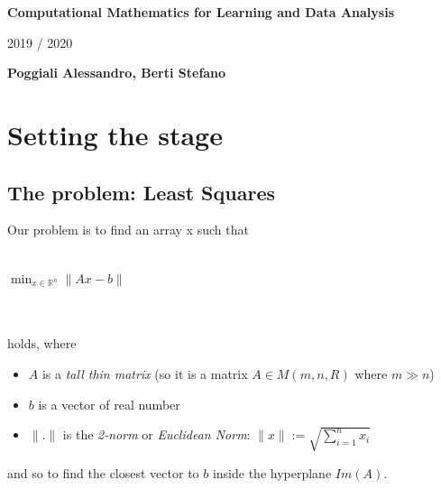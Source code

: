 \documentclass{article}
\begin{document}
\thispagestyle{plain}
\begin{center}
    \Large
    \textbf{Computational Mathematics for Learning and Data Analysis}

    \vspace{0.4cm}
    \large
    2019 / 2020

    \vspace{0.4cm}
    \textbf{Poggiali Alessandro, Berti Stefano}

    \vspace{0.9cm}
\end{center}

\newpage
\section{Setting the stage}\label{sec:setting-the-stage}

\subsection{The problem: Least Squares}\label{subsec:linear-square-problem}
Our problem is to find an array x such that \\\\
\centerline{$\min_{x \in \mathds{R}^n}\|Ax-b\|$} \\\\
holds, where
\begin{itemize}
	\item $A$ is a \textit{tall thin matrix} (so it is a matrix $A\in M(m, n, R)$ where $m \gg n$)
	\item $b$ is a vector of real number
	\item $\|.\|$ is the \textit{2-norm} or \textit{Euclidean Norm}: $\|x\| := \sqrt{\sum_{i=1}^n x_i}$
\end{itemize}
and so to find the closest vector to $b$ inside the hyperplane $Im(A)$.

\end{document}
